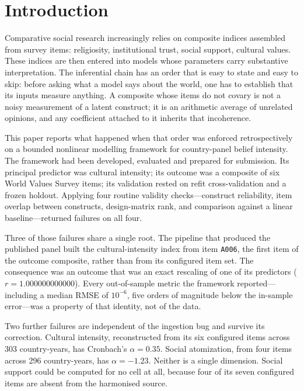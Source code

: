 \documentclass[11pt]{article}
\begin{document}
\clearpage
{}
\setcounter{page}{1}

\section{Introduction}
\thispagestyle{plain}
Comparative social research increasingly relies on composite indices assembled from survey items: religiosity, institutional trust, social support, cultural values. These indices are then entered into models whose parameters carry substantive interpretation. The inferential chain has an order that is easy to state and easy to skip: before asking what a model says about the world, one has to establish that its inputs measure anything. A composite whose items do not covary is not a noisy measurement of a latent construct; it is an arithmetic average of unrelated opinions, and any coefficient attached to it inherits that incoherence.

This paper reports what happened when that order was enforced retrospectively on a bounded nonlinear modelling framework for country-panel belief intensity. The framework had been developed, evaluated and prepared for submission. Its principal predictor was cultural intensity; its outcome was a composite of six World Values Survey items; its validation rested on refit cross-validation and a frozen holdout. Applying four routine validity checks---construct reliability, item overlap between constructs, design-matrix rank, and comparison against a linear baseline---returned failures on all four.

Three of those failures share a single root. The pipeline that produced the published panel built the cultural-intensity index from item \texttt{A006}, the first item of the outcome composite, rather than from its configured item set. The consequence was an outcome that was an exact rescaling of one of its predictors ($r=1.000000000000$). Every out-of-sample metric the framework reported---including a median RMSE of $10^{-6}$, five orders of magnitude below the in-sample error---was a property of that identity, not of the data.

Two further failures are independent of the ingestion bug and survive its correction. Cultural intensity, reconstructed from its six configured items across 303 country-years, has Cronbach's $\alpha=0.35$. Social atomization, from four items across 296 country-years, has $\alpha=-1.23$. Neither is a single dimension. Social support could be computed for no cell at all, because four of its seven configured items are absent from the harmonised source.
\end{document}
